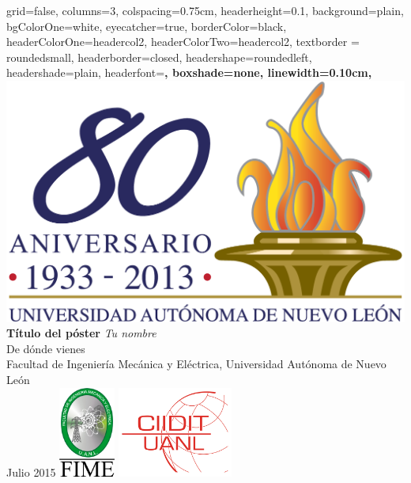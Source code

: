 \documentclass[a0paper, portrait]{baposter}
\begin{document}
\sffamily
\begin{poster}{
    grid=false,
    columns=3,
    colspacing=0.75cm, %
    headerheight=0.1\textheight,
    background=plain,
    bgColorOne=white,
    eyecatcher=true,
    borderColor=black,
    headerColorOne=headercol2,
    headerColorTwo=headercol2,
    textborder = roundedsmall,
    headerborder=closed,
    headershape=roundedleft,
    headershade=plain,
    headerfont=\Large\sffamily\bfseries,
    boxshade=none,
    linewidth=0.10cm,    
}
  { \includegraphics[height=0.1\textheight]{uanl.png} }
  {
    \bf\sf T\'itulo del p\'oster
  }
  {
    {\it Tu nombre} \\
    \small {
    De d\'onde vienes \\
    Facultad de Ingenier\'ia Mec\'anica y El\'ectrica, Universidad Aut\'onoma de Nuevo Le\'on \\
    Julio 2015       
    }
  }
  {
    \includegraphics[height=8.0em]{fime.pdf}
    \hspace{2.0em}
    \includegraphics[height=8.0em]{ciidit.png}
  }


\end{poster}
\end{document}
